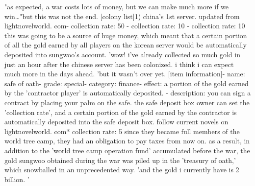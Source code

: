 "as expected, a war costs lots of money, but we can make much more if we win…"but this was not the end.
[colony list]1) china's 1st server.
updated from lightnovelworld.
c‌om- collection rate: 50%
- collection rate: 10%
 - collection rate: 10%
 this was going to be a source of huge money, which meant that a certain portion of all the gold earned by all players on the korean server would be automatically deposited into sungwoo's account.
'wow! i've already collected so much gold in just an hour after the chinese server has been colonized.
 i think i can expect much more in the days ahead.
'but it wasn't over yet.
[item information]- name: safe of oath- grade: special- category: finance- effect: a portion of the gold earned by the 'contractor player' is automatically deposited.
- description: you can sign a contract by placing your palm on the safe.
 the safe deposit box owner can set the 'collection rate', and a certain portion of the gold earned by the contractor is automatically deposited into the safe deposit box.
follow current novels on lightnovelworld.
c­om* collection rate: 5%
since they became full members of the world tree camp, they had an obligation to pay taxes from now on.
as a result, in addition to the 'world tree camp operation fund' accumulated before the war, the gold sungwoo obtained during the war was piled up in the 'treasury of oath,' which snowballed in an unprecedented way.
'and the gold i currently have is 2 billion.
'

